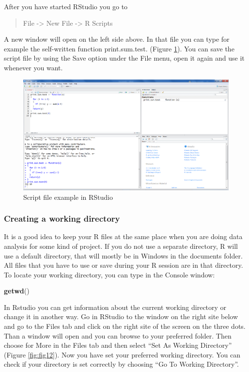 \documentclass[]{book}
\newenvironment{Shaded}{\begin{snugshade}}{\end{snugshade}}
\newcommand{\KeywordTok}[1]{\textcolor[rgb]{0.13,0.29,0.53}{\textbf{#1}}}
\newcommand{\NormalTok}[1]{#1}
\theoremstyle{definition}
\theoremstyle{definition}
\theoremstyle{definition}
\theoremstyle{remark}
\begin{document}
After you have started RStudio you go to

\begin{quote}
File -\textgreater{} New File -\textgreater{} R Scripts
\end{quote}

A new window will open on the left side above. In that file you can type
for example the self-written function print.sum.test. (Figure
\ref{fig:fig11}). You can save the script file by using the Save option
under the File menu, open it again and use it whenever you want.

\begin{figure}

{\centering \includegraphics[width=0.8\linewidth]{images/fig1.11} 

}

\caption{Script file example in RStudio}\label{fig:fig11}
\end{figure}

\subsubsection{Creating a working
directory}\label{creating-a-working-directory}

It is a good idea to keep your R files at the same place when you are
doing data analysis for some kind of project. If you do not use a
separate directory, R will use a default directory, that will mostly be
in Windows in the documents folder. All files that you have to use or
save during your R session are in that directory. To locate your working
directory, you can type in the Console window:

\begin{Shaded}
\begin{Highlighting}[]
\KeywordTok{getwd}\NormalTok{()}
\end{Highlighting}
\end{Shaded}

In Rstudio you can get information about the current working directory
or change it in another way. Go in RStudio to the window on the right
site below and go to the Files tab and click on the right site of the
screen on the three dots. Than a window will open and you can browse to
your preferred folder. Then choose for More in the Files tab and then
select ``Set As Working Directory'' (Figure \ref{fig:fig12}). Now you
have set your preferred working directory. You can check if your
directory is set correctly by choosing ``Go To Working Directory''.
\end{document}
